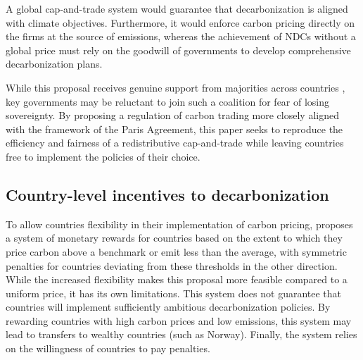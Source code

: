 \documentclass[12pt,english]{article}
\begin{document}
A global cap-and-trade system would guarantee that decarbonization is aligned with climate objectives. %
Furthermore, it would enforce carbon pricing directly on the firms at the source of emissions, whereas the achievement of NDCs without a global price must rely on the goodwill of governments to develop comprehensive decarbonization plans. %

While this proposal receives genuine support from majorities across countries \citep{fabre_majority_2025,fabre_global_2025}, key governments may be reluctant to join such a coalition for fear of losing sovereignty. By proposing a regulation of carbon trading more closely aligned with the framework of the Paris Agreement, this paper seeks to reproduce the efficiency and fairness of a redistributive cap-and-trade while leaving countries free to implement the policies of their choice. %

\subsection{Country-level incentives to decarbonization}

To allow countries flexibility in their implementation of carbon pricing, \cite{stoft_flexible_2009} proposes a system of monetary rewards for countries based on the extent to which they price carbon above a benchmark or emit less than the average, with symmetric penalties for countries deviating from these thresholds in the other direction. While the increased flexibility makes this proposal more feasible compared to a uniform price, it has its own limitations. This system does not guarantee that countries will implement sufficiently ambitious decarbonization policies. By rewarding countries with high carbon prices and low emissions, this system may lead to transfers to wealthy countries (such as Norway). Finally, the system relies on the willingness of countries to pay penalties.
\end{document}
